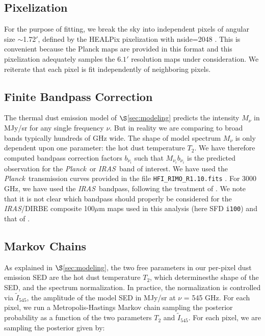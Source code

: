 \documentclass{emulateapj}
\newcommand{\IRAS}{{\it IRAS}}
\newcommand{\PLANCK}{{\it Planck}}
\begin{document}
\subsection{Pixelization}
\label{sec:pix}
For the purpose of fitting, we break the sky into independent pixels of 
angular size $\sim$1.72$'$, defined by the HEALPix pixelization with nside=2048
\citep{healpix}. This is convenient because the Planck maps are provided in 
this format and this pixelization adequately samples the $6.1'$ resolution maps
under consideration. We reiterate that each pixel is fit independently of 
neighboring pixels.

\subsection{Finite Bandpass Correction}
The thermal dust emission model of $\S$\ref{sec:modeling} predicts the 
intensity $M_{\nu}$ in MJy/sr for any single frequency $\nu$. But in reality
we are comparing to broad bands typically hundreds of GHz wide. The shape of 
model spectrum $M_{\nu}$ is only dependent upon one parameter: the hot
dust temperature $T_2$. We have therefore computed bandpass correction factors
$b_{\nu_i}$ such that $M_{\nu_i}b_{\nu_i}$ is the predicted observation for the
\PLANCK~or \IRAS~band of interest. We have used the \PLANCK~transmission 
curves provided in the file \verb|HFI_RIMO_R1.10.fits| \citep{planckresponse}. 
For 3000 GHz, we have used the \IRAS~bandpass, following the treatment of
\cite{planckdust}. We note that it is not clear which bandpass should
properly be considered for the \IRAS/DIRBE composite 100$\mu$m maps used in 
this analysis (here SFD \verb|i100|) and that of \cite{planckdust}.


\subsection{Markov Chains}
As explained in $\S$\ref{sec:modeling}, the two free parameters in our 
per-pixel dust emission SED are the hot dust temperature $T_2$, which 
determinesthe shape of the SED, and the spectrum normalization. In practice,
the normalization is controlled via $\tilde{I}_{545}$, the amplitude of the 
model SED in MJy/sr at $\nu$ = 545 GHz. For each pixel, we run a 
Metropolis-Hastings Markov chain sampling the posterior probability as a 
function of the two parameters $T_2$ and $\tilde{I}_{545}$. For each pixel, we 
are sampling the posterior given by:
\end{document}
